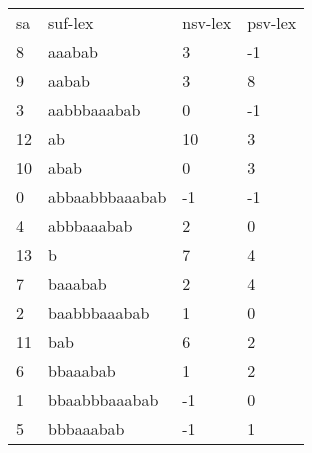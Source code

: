 \begin{table}[h]
\begin{tabular}{llll}
sa & suf-lex        & nsv-lex & psv-lex \\
8  & aaabab         & 3       & -1      \\
9  & aabab          & 3       & 8       \\
3  & aabbbaaabab    & 0       & -1      \\
12 & ab             & 10      & 3       \\
10 & abab           & 0       & 3       \\
0  & abbaabbbaaabab & -1      & -1      \\
4  & abbbaaabab     & 2       & 0       \\
13 & b              & 7       & 4       \\
7  & baaabab        & 2       & 4       \\
2  & baabbbaaabab   & 1       & 0       \\
11 & bab            & 6       & 2       \\
6  & bbaaabab       & 1       & 2       \\
1  & bbaabbbaaabab  & -1      & 0       \\
5  & bbbaaabab      & -1      & 1      
\end{tabular}
\end{table}

